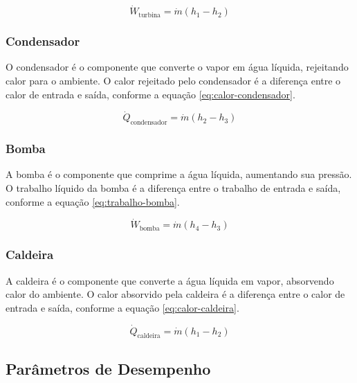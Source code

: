 \documentclass[
	article,			%
	11pt,				%
	oneside,			%
	a4paper,			%
	english,			%
	brazil,				%
	sumario=tradicional
	]{abntex2}
\begin{document}
\begin{equation}
	\dot{W}_{\text{turbina}} = \dot{m}(h_1 - h_2)
	\label{eq:trabalho-turbina}
\end{equation}

\subsubsection{Condensador}

O condensador é o componente que converte o vapor em água líquida, rejeitando calor para o ambiente. O calor rejeitado pelo condensador é a diferença entre o calor de entrada e saída, conforme a equação \ref{eq:calor-condensador}.

\begin{equation}
	\dot{Q}_{\text{condensador}} = \dot{m}(h_2 - h_3)
	\label{eq:calor-condensador}
\end{equation}

\subsubsection{Bomba}

A bomba é o componente que comprime a água líquida, aumentando sua pressão. O trabalho líquido da bomba é a diferença entre o trabalho de entrada e saída, conforme a equação \ref{eq:trabalho-bomba}.

\begin{equation}
	\dot{W}_{\text{bomba}} = \dot{m}(h_4 - h_3)
	\label{eq:trabalho-bomba}
\end{equation}

\subsubsection{Caldeira}

A caldeira é o componente que converte a água líquida em vapor, absorvendo calor do ambiente. O calor absorvido pela caldeira é a diferença entre o calor de entrada e saída, conforme a equação \ref{eq:calor-caldeira}.

\begin{equation}
	\dot{Q}_{\text{caldeira}} = \dot{m}(h_1 - h_2)
	\label{eq:calor-caldeira}
\end{equation}

\subsection{Parâmetros de Desempenho}
\end{document}
